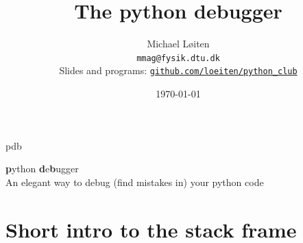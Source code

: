 \documentclass[
    size=20pt,
    style=sailor,
    display=slides,
    paper=smartboard,
    orient=landscape,
]{powerdot}
\title{The python debugger}
\author{Michael L{\o}iten\\
\texttt{mmag@fysik.dtu.dk}\\
Slides and programs:
\href{https://github.com/loeiten/python_club/tree/master/15.04.29-pdb_debugger}{
\texttt{github.com/loeiten/python\_club}} }
\date{\today}
\begin{document}
\maketitle


%







\begin{slide}{pdb}
\vspace*{4cm}
\begin{center}
 \textbf{p}ython \textbf{d}e\textbf{b}ugger\\
 An elegant way to debug (find mistakes in) your python code
\end{center}
\end{slide}




\section{Short intro to the stack frame}
\end{document}
